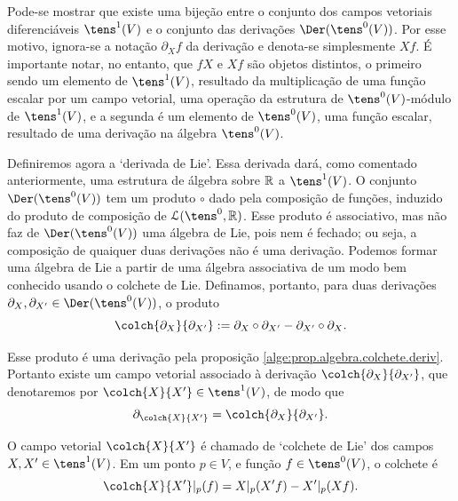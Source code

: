 Pode-se mostrar que existe uma bijeção entre o conjunto dos campos vetoriais diferenciáveis $\tens^1(V)$ e o conjunto das derivações $\Der(\tens^0(V))$. Por esse motivo, ignora-se a notação $\partial_X f$ da derivação e denota-se simplesmente $Xf$. É importante notar, no entanto, que $fX$ e $Xf$ são objetos distintos, o primeiro sendo um elemento de $\tens^1(V)$, resultado da multiplicação de uma função escalar por um campo vetorial, uma operação da estrutura de $\tens^0(V)$-módulo de $\tens^1(V)$, e a segunda é um elemento de $\tens^0(V)$, uma função escalar, resultado de uma derivação na álgebra $\tens^0(V)$.

Definiremos agora a `derivada de Lie'. Essa derivada dará, como comentado anteriormente, uma estrutura de álgebra sobre $\mathbb{R}$ a $\tens^1(V)$. O conjunto $\Der(\tens^0(V))$ tem um produto $\circ$ dado pela composição de funções, induzido do produto de composição de $\lin(\tens^0,\R)$. Esse produto é associativo, mas não faz de $\Der(\tens^0(V))$ uma álgebra de Lie, pois nem é fechado; ou seja, a composição de quaiquer duas derivações não é uma derivação. Podemos formar uma álgebra de Lie a partir de uma álgebra associativa de um modo bem conhecido usando o colchete de Lie. Definamos, portanto, para duas derivações $\partial_X,\partial_{X'} \in \Der(\tens^0(V))$, o produto
	\begin{equation*}
	\colch{\partial_X}{\partial_{X'}} := \partial_X \circ \partial_{X'} - \partial_{X'} \circ \partial_X.
	\end{equation*}

Esse produto é uma derivação pela proposição \ref{alge:prop.algebra.colchete.deriv}. Portanto existe um campo vetorial associado à derivação $\colch{\partial_X}{\partial_{X'}}$, que denotaremos por $\colch{X}{X'} \in \tens^1(V)$, de modo que
	\begin{equation*}
	\partial_{\colch{X}{X'}} = \colch{\partial_X}{\partial_{X'}}.
	\end{equation*}

O campo vetorial $\colch{X}{X'}$ é chamado de `colchete de Lie' dos campos $X,X' \in \tens^1(V)$. Em um ponto $p \in V$, e função $f \in \tens^0(V)$, o colchete é
	\begin{equation*}
	\colch{X}{X'}|_p(f) = X|_p(X' f) - X'|_p(X f).
	\end{equation*}

